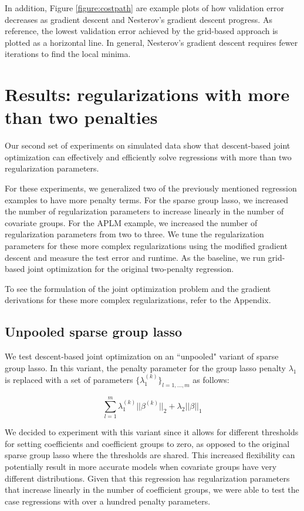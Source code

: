 \documentclass[10pt,letterpaper]{article}
\begin{document}
In addition, Figure \ref{figure:costpath} are example plots of how validation error decreases as gradient descent and Nesterov's gradient descent progress. As reference, the lowest validation error achieved by the grid-based approach is plotted as a horizontal line. In general, Nesterov's gradient descent requires fewer iterations to find the local minima.

\section{Results: regularizations with more than two penalties}

Our second set of experiments on simulated data show that descent-based joint optimization can effectively and efficiently solve regressions with more than two regularization parameters.

For these experiments, we generalized two of the previously mentioned regression examples to have more penalty terms. For the sparse group lasso, we increased the number of regularization parameters to increase linearly in the number of covariate groups. For the APLM example, we increased the number of regularization parameters from two to three. We tune the regularization parameters for these more complex regularizations using the modified gradient descent and measure the test error and runtime. As the baseline, we run grid-based joint optimization for the original two-penalty regression.

To see the formulation of the joint optimization problem and the gradient derivations for these more complex regularizations, refer to the Appendix.

\subsection{Unpooled sparse group lasso}

We test descent-based joint optimization on an ``unpooled" variant of sparse group lasso. In this variant, the penalty parameter for the group lasso penalty $\lambda_1$ is replaced with a set of parameters $\{\lambda_1^{(k)}\}_{l=1,...,m}$ as follows:

\begin{equation}
\sum_{l=1}^m \lambda_1^{(k)} \lvert\lvert \beta^{(k)} \rvert \rvert_2
+ \lambda_2 \lvert\lvert \beta \rvert \rvert_1
\end{equation}

We decided to experiment with this variant since it allows for different thresholds for setting coefficients and coefficient groups to zero, as opposed to the original sparse group lasso where the thresholds are shared. This increased flexibility can potentially result in more accurate models when covariate groups have very different distributions. Given that this regression has regularization parameters that increase linearly in the number of coefficient groups, we were able to test the case regressions with over a hundred penalty parameters.
\end{document}
